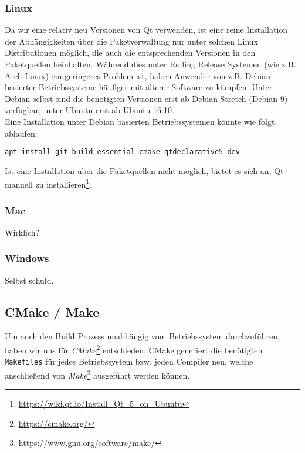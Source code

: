 \subsubsection{Linux}

Da wir eine relativ neu Versionen von Qt verwenden, ist eine reine Installation der
Abhängigkeiten über die Paketverwaltung nur unter solchen Linux Distributionen möglich,
die auch die entsprechenden Versionen in den Paketquellen beinhalten. Während dies unter
Rolling Release Systemen (wie z.B. Arch Linux) ein geringeres Problem ist, haben Anwender von
z.B. Debian basierter Betriebssysteme häufiger mit älterer Software zu kämpfen.
Unter Debian selbst sind die benötigten Versionen erst ab Debian Stretch (Debian 9)
verfügbar, unter Ubuntu erst ab Ubuntu 16.10. \\
Eine Installation unter Debian basierten Betriebssystemen könnte wie folgt ablaufen: \\

\begin{lstlisting}
apt install git build-essential cmake qtdeclarative5-dev
\end{lstlisting}

Ist eine Installation über die Paketquellen nicht möglich, bietet es sich an, Qt manuell
zu installieren\footnote{\url{https://wiki.qt.io/Install_Qt_5_on_Ubuntu}}.




\subsubsection{Mac}

Wirklich?

\subsubsection{Windows}

Selbst schuld.

\subsection{CMake / Make}
\label{dev-report-cmake-build}
Um auch den Build Prozess unabhängig vom Betriebssystem durchzuführen, haben wir uns für
\textit{CMake}\footnote{\url{https://cmake.org/}} entschieden. CMake generiert die benötigten
\texttt{Makefiles} für jedes Betriebssystem bzw. jeden Compiler neu, welche anschließend
von \textit{Make}\footnote{\url{https://www.gnu.org/software/make/}} ausgeführt werden können.

